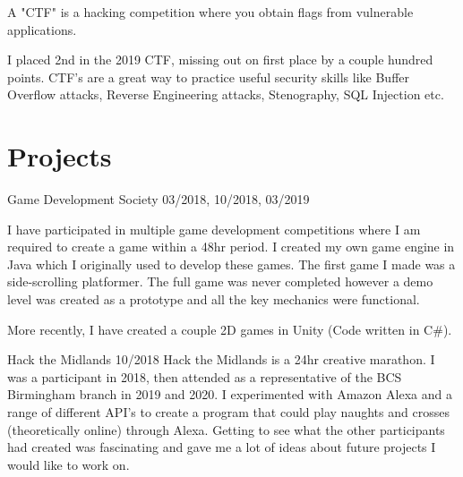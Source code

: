 \documentclass[11pt]{article} %
\begin{document}
\begin{paracol}{2}
{A "CTF" is a hacking competition where you obtain flags from vulnerable applications.

I placed 2nd in the 2019 CTF, missing out on first place by a couple hundred points. CTF's are a great way to practice useful
security skills like Buffer Overflow attacks, Reverse Engineering attacks, Stenography, SQL Injection etc.
}  %


\pagebreak %
\switchcolumn %


\section{Projects}
{Game Development Society} %
{03/2018, 10/2018, 03/2019} %
{} %
{} %
{I have participated in multiple game development competitions where I am
required to create a game within a 48hr period. I created my own game engine in Java which I
originally used to develop these games. The first game I made was a side-scrolling platformer. The full game
was never completed however a demo level was created as a prototype and all the key mechanics were functional.

More recently, I have created a couple 2D games in Unity (Code written in C\#).}  %


{Hack the Midlands} %
{10/2018} %
{} %
{} %
{Hack the Midlands is a 24hr creative marathon. I was a participant in 2018,
then attended as a representative of the BCS Birmingham branch in 2019 and 2020.
I experimented with Amazon Alexa and a range of different API’s to create a
program that could play naughts and crosses (theoretically online) through Alexa.
Getting to see what the other participants had created was fascinating and gave me a lot of ideas about future projects I would like to work on.}  %


\end{paracol}
\end{document}
